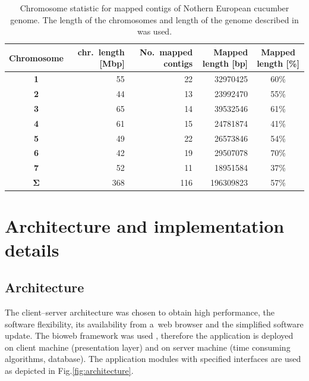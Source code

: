 \documentclass[]{spie}
\begin{document}
\begin{table}
	\centering
	\begin{tabular}{|c||r|r|r|c|} \hline
	  \textbf{Chromosome}    & chr.\ length [Mbp] & No.\ mapped contigs & Mapped length [bp] & Mapped length [\%] \\
      \hline
      \textbf{1}             & 55                 &  22                 &  32970425          & 60\%               \\
      \textbf{2}             & 44                 &  13                 &  23992470          & 55\%               \\
      \textbf{3}             & 65                 &  14                 &  39532546          & 61\%               \\
      \textbf{4}             & 61                 &  15                 &  24781874          & 41\%               \\
      \textbf{5}             & 49                 &  22                 &  26573846          & 54\%               \\
      \textbf{6}             & 42                 &  19                 &  29507078          & 70\%               \\
      \textbf{7}             & 52                 &  11                 &  18951584          & 37\%               \\
      \hline
      $\mathbf{\Sigma}$      &368                 & 116                 & 196309823          &  57\%              \\
      \hline
	\end{tabular}
	\caption{Chromosome statistic for mapped contigs of Nothern European cucumber genome.
      The length of the chromosomes and length of the genome described in \cite{chen1998reevaluation} was used.}
	\label{tab:genome_stat}
\end{table}

\section{Architecture and implementation details}

\subsection{Architecture}

The client--server architecture was chosen to obtain high performance, the software flexibility,
its availability from a~web browser and the simplified software update.
The bioweb framework was used \cite{rn:bmri2014biosoftarch},
therefore the application is deployed on client machine (presentation layer) and on server machine (time consuming algorithms, database).
The application modules with specified interfaces are used as depicted in Fig.\ref{fig:architecture}.
\end{document}
